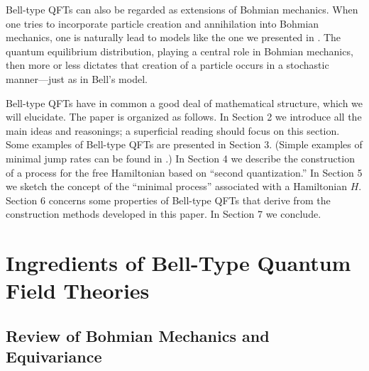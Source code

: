 \documentclass[12pt]{article}
\newcommand{\1}{\mathbf{1}} %
\begin{document}
Bell-type QFTs can also be regarded as extensions of Bohmian
mechanics.  When one tries to incorporate particle creation and
annihilation into Bohmian mechanics, one is naturally lead to models
like the one we presented in \cite{crea1}.  The quantum equilibrium
distribution, playing a central role in Bohmian mechanics, then more
or less dictates that creation of a particle occurs in a stochastic
manner---just as in Bell's model.

Bell-type QFTs have in common a good deal of mathematical structure,
which we will elucidate.  The paper is organized as follows.  In
Section 2 we introduce all the main ideas and reasonings; a
superficial reading should focus on this section.  Some examples of
Bell-type QFTs are presented in Section 3. (Simple examples of minimal
jump rates can be found in \cite{crea2A}.)  In Section 4 we describe
the construction of a process for the free Hamiltonian based on
``second quantization.'' In Section 5 we sketch the concept of the
``minimal process'' associated with a Hamiltonian $H$. Section 6
concerns some properties of Bell-type QFTs that derive from the
construction methods developed in this paper.  In Section 7 we
conclude.




\section{Ingredients of Bell-Type Quantum Field Theories}
\label{sec:making}

\subsection{Review of Bohmian Mechanics and Equivariance}
\end{document}
